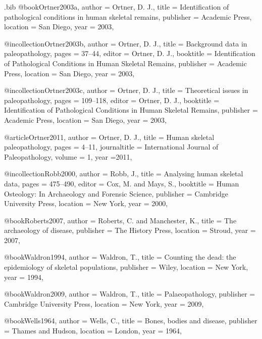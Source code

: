 \begin{filecontents}{\IJSRAidentifier.bib}
@book{Ortner2003a,
    author = {Ortner, D. J.},
    title = {Identification of pathological conditions in human skeletal remains},
    publisher = {Academic Press},
    location = {San Diego},
    year = {2003},
    }
    
@incollection{Ortner2003b,
    author = {Ortner, D. J.},
    title = {Background data in paleopathology},
    pages = {37--44},
    editor = {Ortner, D. J.},
    booktitle = {Identification of Pathological Conditions in Human Skeletal Remains},
    publisher = {Academic Press},
    location = {San Diego},
    year = {2003},
    }

@incollection{Ortner2003c,
    author = {Ortner, D. J.},
    title = {Theoretical issues in paleopathology},
    pages = {109--118},
    editor = {Ortner, D. J.},
    booktitle = {Identification of Pathological Conditions in Human Skeletal Remains},
    publisher = {Academic Press},
    location = {San Diego},
    year = {2003},
}

@article{Ortner2011,
        author = {Ortner, D. J.},
                               title = {Human skeletal paleopathology},
   pages = {4--11},
   journaltitle = {International Journal of Paleopathology},
   volume = {1},
   year ={2011},    
    }

@incollection{Robb2000,
    author = {Robb, J.},
    title = {Analysing human skeletal data},
    pages = {475--490},
    editor = {Cox, M. and Mays, S.},
    booktitle = {Human Osteology: In Archaeology and Forensic Science},
    publisher = {Cambridge University Press},
    location = {New York},
    year = {2000},
    }

@book{Roberts2007,
    author = {Roberts, C. and Manchester, K.},
    title = {The archaeology of disease},
    publisher = {The History Press},
    location = {Stroud},
    year = {2007},
    }

@book{Waldron1994,
    author = {Waldron, T.},
    title = {Counting the dead: the epidemiology of skeletal populations},
    publisher = {Wiley},
    location = {New York},
    year = {1994},
    }

@book{Waldron2009,
    author = {Waldron, T.},
    title = {Palaeopathology},
    publisher = {Cambridge University Press},
    location = {New York},
    year = {2009},
    }

@book{Wells1964,
    author = {Wells, C.},
    title = {Bones, bodies and disease},
    publisher = {Thames and Hudson},
    location = {London},
    year = {1964},
    }

\end{filecontents}

